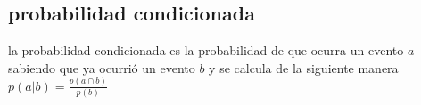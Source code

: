 \subsection{probabilidad condicionada}
la probabilidad condicionada es la probabilidad de que ocurra un evento $a$ sabiendo que ya ocurrió un evento $b$ y se calcula de la siguiente manera $p(a|b)=\frac{p(a\cap b)}{p(b)}$
